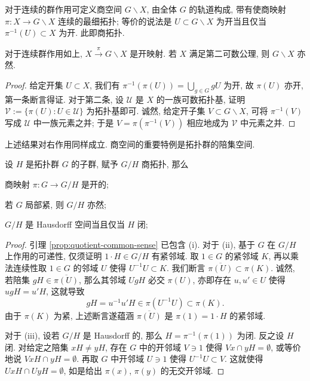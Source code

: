对于连续的群作用可定义商空间 $G \backslash X$, 由全体 $G$ 的轨道构成, 带有使商映射 $\pi: X \to G \backslash X$ 连续的最细拓扑; 等价的说法是 $U \subset G \backslash X$ 为开当且仅当 $\pi^{-1}(U) \subset X$ 为开. 此即商拓扑. 

\begin{lemma}\label{prop:quotient-common-sense}
	对于连续群作用如上, $X \xrightarrow{\pi} G \backslash X$ 是开映射. 若 $X$ 满足第二可数公理, 则 $G \backslash X$ 亦然.
\end{lemma}
\begin{proof}
	给定开集 $U \subset X$, 我们有 $\pi^{-1}(\pi(U)) = \bigcup_{g \in G} gU$ 为开, 故 $\pi(U)$ 亦开, 第一条断言得证. 对于第二条, 设 $\mathcal{U}$ 是 $X$ 的一族可数拓扑基, 证明 $\mathcal{V} := \{\pi(U) : U \in \mathcal{U} \}$ 为拓扑基即可. 诚然, 给定开子集 $V \subset G \backslash X$, 可将 $\pi^{-1}(V)$ 写成 $\mathcal{U}$ 中一族元素之并; 于是 $V = \pi(\pi^{-1}(V))$ 相应地成为 $\mathcal{V}$ 中元素之并.
\end{proof}
上述结果对右作用同样成立. 商空间的重要特例是拓扑群的陪集空间.

\begin{proposition}\label{prop:coset-space}
	设 $H$ 是拓扑群 $G$ 的子群, 赋予 $G/H$ 商拓扑, 那么
	\begin{compactenum}[(i)]
		\item 商映射 $\pi: G \to G/H$ 是开的;
		\item 若 $G$ 局部紧, 则 $G/H$ 亦然;
		\item $G/H$ 是 Hausdorff 空间当且仅当 $H$ 闭;
	\end{compactenum}
\end{proposition}
\begin{proof}
	引理 \ref{prop:quotient-common-sense} 已包含 (i). 对于 (ii), 基于 $G$ 在 $G/H$ 上作用的可递性, 仅须证明 $1 \cdot H \in G/H$ 有紧邻域. 取 $1 \in G$ 的紧邻域 $K$, 再以乘法连续性取 $1 \in G$ 的邻域 $U$ 使得 $U^{-1} U \subset K$. 我们断言 $\overline{\pi(U)} \subset \pi(K)$. 诚然, 若陪集 $gH \in \overline{\pi(U)}$, 那么其邻域 $UgH$ 必交 $\pi(U)$, 亦即存在 $u, u' \in U$ 使得 $ugH = u'H$, 这就导致
	\[ gH = u^{-1} u'H \in \pi(U^{-1} U) \subset \pi(K). \]
	由于 $\pi(K)$ 为紧, 上述断言遂蕴涵 $\overline{\pi(U)}$ 是 $\pi(1) = 1 \cdot H$ 的紧邻域.
	
	对于 (iii), 设若 $G/H$ 是 Hausdorff 的, 那么 $H = \pi^{-1}(\pi(1))$ 为闭. 反之设 $H$ 闭. 对给定之陪集 $xH \neq yH$, 存在 $G$ 中的开邻域 $V \ni 1$ 使得 $Vx \cap yH = \emptyset$, 或等价地说 $VxH \cap yH = \emptyset$. 再取 $G$ 中开邻域 $U \ni 1$ 使得 $U^{-1} U \subset V$. 这就使得 $UxH \cap UyH = \emptyset$, 如是给出 $\pi(x)$, $\pi(y)$ 的无交开邻域.
\end{proof}

